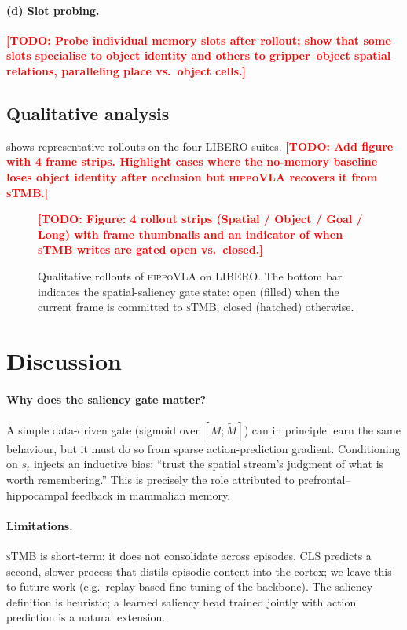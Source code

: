 \documentclass[10pt,letterpaper]{article}
\newcommand{\todo}[1]{\textcolor{red}{\textbf{[TODO: #1]}}}
\newcommand{\method}{\textsc{hippoVLA}\xspace}
\newcommand{\sTMB}{\textsc{sTMB}\xspace}
\begin{document}
\paragraph{(d) Slot probing.} \todo{Probe individual memory slots after rollout; show that some slots specialise to object identity and others to gripper--object spatial relations, paralleling place vs.\ object cells.}

\subsection{Qualitative analysis}
 shows representative rollouts on the four LIBERO suites. \todo{Add figure with 4 frame strips. Highlight cases where the no-memory baseline loses object identity after occlusion but \method recovers it from \sTMB.}

\begin{figure}[t]
\centering
\todo{Figure: 4 rollout strips (Spatial / Object / Goal / Long) with frame thumbnails and an indicator of when \sTMB writes are gated open vs.\ closed.}
\caption{Qualitative rollouts of \method on LIBERO. The bottom bar indicates the spatial-saliency gate state: open (filled) when the current frame is committed to \sTMB, closed (hatched) otherwise.}
\label{fig:rollouts}
\end{figure}

\section{Discussion}
\label{sec:discussion}

\paragraph{Why does the saliency gate matter?}
A simple data-driven gate (sigmoid over $[M;\tilde M]$) can in principle learn the same behaviour, but it must do so from sparse action-prediction gradient. Conditioning on $s_t$ injects an inductive bias: ``trust the spatial stream's judgment of what is worth remembering.'' This is precisely the role attributed to prefrontal--hippocampal feedback in mammalian memory.

\paragraph{Limitations.}
\sTMB is short-term: it does not consolidate across episodes. CLS predicts a second, slower process that distils episodic content into the cortex; we leave this to future work (e.g.\ replay-based fine-tuning of the backbone). The saliency definition is heuristic; a learned saliency head trained jointly with action prediction is a natural extension.
\end{document}
